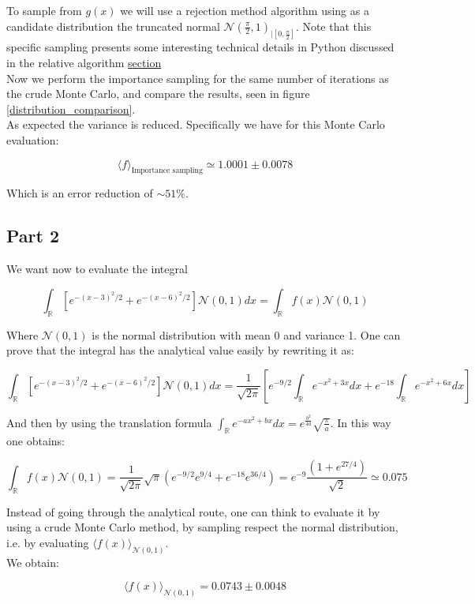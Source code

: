 To sample from $g(x)$ we will use a rejection method algorithm using as a candidate distribution the truncated normal $\mathcal{N}(\frac{\pi}{2}, 1)_{\mid [0, \frac{\pi}{2}]}$. 
Note that this specific sampling presents some interesting technical details in Python discussed in the relative algorithm \hyperref[par:detail_rejection]{section} \\
Now we perform the importance sampling for the same number of iterations as the crude Monte Carlo, and compare the results, seen in figure \ref{distribution_comparison}. \\
As expected the variance is reduced. Specifically we have for this Monte Carlo evaluation:

$$ \langle f \rangle_{\text{Importance sampling}} \simeq 1.0001 \pm 0.0078 $$

Which is an error reduction of $\sim 51 \%$.

\subsection*{Part 2} We want now to evaluate the integral


$$\int_{\mathbb{R}}\left[ e^{-(x-3)^2/2}+e^{-(x-6)^2/2} \right] \mathcal{N}(0,1) dx = \int_{\mathbb{R}} f(x) \mathcal{N}(0,1) $$

Where $\mathcal{N}(0,1)$ is the normal distribution with mean 0 and variance 1.
One can prove that the integral has the analytical value easily by rewriting it as:

$$ \int_{\mathbb{R}}\left[ e^{-(x-3)^2/2}+e^{-(x-6)^2/2} \right] \mathcal{N}(0,1) dx = \frac{1}{\sqrt{2\pi}} \left[ e^{-9/2}\int_{\mathbb{R}}e^{-x^2+3x} dx + e^{-18}\int_{\mathbb{R}}e^{-x^2+6x} dx \right] $$

And then by using the translation formula $\int_{\mathbb{R}} e^{-ax^2+bx} dx = e^{\frac{b^2}{4a}} \sqrt{\frac{\pi}{a}}$. In this way one obtains:

$$ \int_{\mathbb{R}} f(x) \mathcal{N}(0,1) = \frac{1}{\sqrt{2 \pi }} \sqrt{\pi} \left( e^{-9/2}e^{9/4} + e^{-18}e^{36/4}  \right) = e^{-9}\frac{(1 + e^{27/4})}{\sqrt{2}} \simeq 0.075$$

Instead of going through the analytical route, one can think to evaluate it by using a crude Monte Carlo method, by sampling respect the normal distribution, 
i.e. by evaluating $\langle f(x) \rangle_{\mathcal{N}(0,1)}$. \\
We obtain:

$$ \langle f(x) \rangle_{\mathcal{N}(0,1)} = 0.0743 \pm 0.0048 $$

